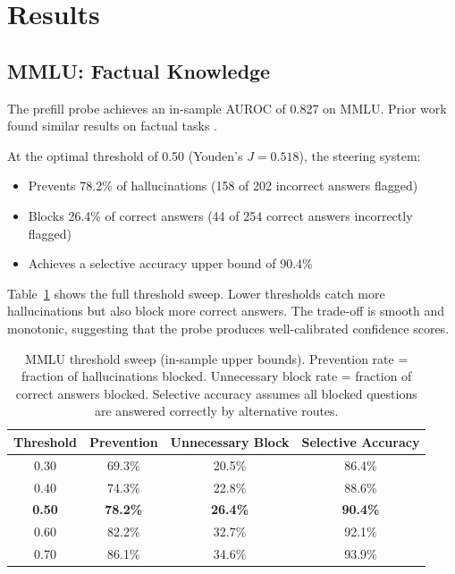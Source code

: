 \documentclass{article}
\begin{document}
\section{Results}

\subsection{MMLU: Factual Knowledge}

The prefill probe achieves an in-sample AUROC of 0.827 on MMLU. Prior work found similar results on factual tasks \citep{kadavath2022language,azaria2023internal}.

At the optimal threshold of 0.50 (Youden's $J = 0.518$), the steering system:
\begin{itemize}
    \item Prevents 78.2\% of hallucinations (158 of 202 incorrect answers flagged)
    \item Blocks 26.4\% of correct answers (44 of 254 correct answers incorrectly flagged)
    \item Achieves a selective accuracy upper bound of 90.4\%
\end{itemize}

Table~\ref{tab:mmlu-thresholds} shows the full threshold sweep. Lower thresholds catch more hallucinations but also block more correct answers. The trade-off is smooth and monotonic, suggesting that the probe produces well-calibrated confidence scores.

\begin{table}[h]
\centering
\caption{MMLU threshold sweep (in-sample upper bounds). Prevention rate = fraction of hallucinations blocked. Unnecessary block rate = fraction of correct answers blocked. Selective accuracy assumes all blocked questions are answered correctly by alternative routes.}
\label{tab:mmlu-thresholds}
\begin{tabular}{cccc}
\toprule
Threshold & Prevention & Unnecessary Block & Selective Accuracy \\
\midrule
0.30 & 69.3\% & 20.5\% & 86.4\% \\
0.40 & 74.3\% & 22.8\% & 88.6\% \\
\textbf{0.50} & \textbf{78.2\%} & \textbf{26.4\%} & \textbf{90.4\%} \\
0.60 & 82.2\% & 32.7\% & 92.1\% \\
0.70 & 86.1\% & 34.6\% & 93.9\% \\
\bottomrule
\end{tabular}
\end{table}
\end{document}
